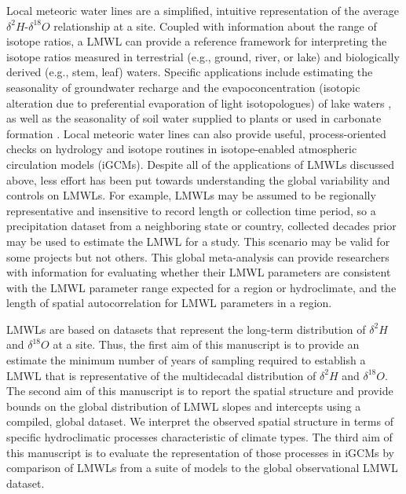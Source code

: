 \documentclass[draft, linenumbers]{agujournal2018}
\begin{document}
Local meteoric water lines are a simplified, intuitive representation of the average $\delta^{2}H$-$\delta^{18}O$ relationship at a site. Coupled with information about the range of isotope ratios, a LMWL can provide a reference framework for interpreting the isotope ratios measured in terrestrial (e.g., ground, river, or lake) and biologically derived (e.g., stem, leaf) waters. Specific applications include estimating the seasonality of groundwater recharge \citep{Jasechko2014} and the evapoconcentration (isotopic alteration due to preferential evaporation of light isotopologues) of lake waters \citep{Bowen2018}, as well as the seasonality of soil water supplied to plants \citep{Brooks2010} or used in carbonate formation \citep{Huth2019}. Local meteoric water lines can also provide useful, process-oriented checks on hydrology and isotope routines in isotope-enabled atmospheric circulation models (iGCMs).  Despite all of the applications of LMWLs discussed above, less effort has been put towards understanding the global variability and controls on LMWLs. For example, LMWLs may be assumed to be regionally representative and insensitive to record length or collection time period, so a precipitation dataset from a neighboring state or country, collected decades prior may be used to estimate the LMWL for a study. This scenario may be valid for some projects but not others. This global meta-analysis can provide researchers with information for evaluating whether their LMWL parameters are consistent with the LMWL parameter range expected for a region or hydroclimate, and the length of spatial autocorrelation for LMWL parameters in a region.

LMWLs are based on datasets that represent the long-term distribution of $\delta^{2}H$ and $\delta^{18}O$ at a site. Thus, the first aim of this manuscript is to provide an estimate the minimum number of years of sampling required to establish a LMWL that is representative of the multidecadal distribution of $\delta^{2}H$ and $\delta^{18}O$. The second aim of this manuscript is to report the spatial structure and provide bounds on the global distribution of LMWL slopes and intercepts using a compiled, global dataset. We interpret the observed spatial structure in terms of specific hydroclimatic processes characteristic of climate types. The third aim of this manuscript is to evaluate the representation of those processes in iGCMs by comparison of LMWLs from a suite of models to the global observational LMWL dataset. 
\end{document}
